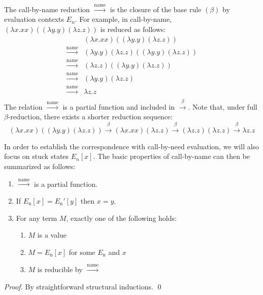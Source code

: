 \documentclass{llncs}
\newcommand{\FULLBETA}{\xrightarrow{\beta}}
\newcommand{\CALLBYNAME}{\xrightarrow{\mathrm{name}}}
\begin{document}
The call-by-name reduction $\CALLBYNAME$ is the closure of the base rule $(\beta)$ by evaluation contexts $E_n$.
For example, in call-by-name,
$(\lambda x.xx)((\lambda y.y)(\lambda z.z))$
is reduced as follows:
\[ \begin{array}{ll}
	& (\lambda x.xx)((\lambda y.y)(\lambda z.z)) \\
	\CALLBYNAME & (\lambda y.y)(\lambda z.z)((\lambda y.y)(\lambda z.z)) \\
	\CALLBYNAME & (\lambda z.z)((\lambda y.y)(\lambda z.z)) \\
	\CALLBYNAME & (\lambda y.y)(\lambda z.z) \\
	\CALLBYNAME & \lambda z.z \\
\end{array} \]
The relation $\CALLBYNAME$ is a partial function and included in $\FULLBETA$.
Note that, under full $\beta$-reduction, there exists a shorter reduction sequence:
\[(\lambda x.xx)((\lambda y.y)(\lambda z.z))\FULLBETA(\lambda x.xx)(\lambda z.z)\FULLBETA(\lambda z.z)(\lambda z.z)\FULLBETA\lambda z.z\]

In order to establish the correspondence with call-by-need evaluation, we will also focus on stuck states $E_n[x]$.  The basic properties of call-by-name can then be summarized as follows:
%
\begin{lemma}\label{determinism-of-call-by-name}
	\begin{enumerate}
		\item $\CALLBYNAME$ is a partial function.
		\item If $E_\mathrm{n}[x]=E_\mathrm{n}'[y]$ then $x=y$. \label{enum:det-name-context}
		\item For any term $M$, exactly one of the following holds: \label{enum:det-name-total}
			\begin{enumerate}
				\item $M$ is a value
				\item $M=E_\mathrm{n}[x]$ for some $E_\mathrm{n}$ and $x$ \label{enum:det-name-total-demand}
				\item $M$ is reducible by $\CALLBYNAME$
			\end{enumerate}
	\end{enumerate}
\end{lemma}
%
\begin{proof}
	By straightforward structural inductions. \qed
\end{proof}
\end{document}
